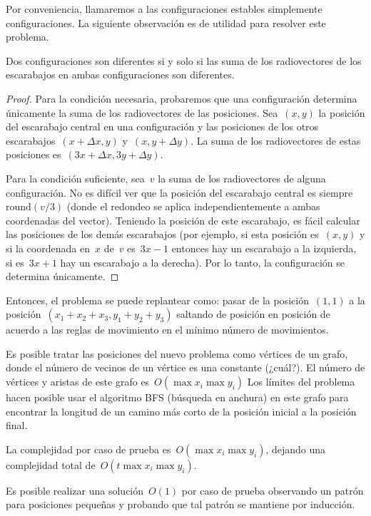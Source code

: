 
Por conveniencia, llamaremos a las configuraciones estables simplemente
configuraciones. La siguiente observación es de utilidad para resolver este problema.

\begin{proposition*}
  Dos configuraciones son diferentes si y solo si las suma de los radiovectores de
  los escarabajos en ambas configuraciones son diferentes.
\end{proposition*}
\begin{proof}
Para la condición necesaria, probaremos que una configuración determina únicamente
la suma de los radiovectores de las posiciones. Sea~$(x, y)$ la posición del
escarabajo central en una configuración y las posiciones de los otros
escarabajos~$(x + \Delta x, y)$ y~$(x, y + \Delta y)$. La suma de los radiovectores
de estas posiciones es~$(3x + \Delta x, 3y + \Delta y)$.

Para la condición suficiente, sea~$v$ la suma de los radiovectores de alguna
configuración. No es difícil ver que la posición del escarabajo central es
siempre~$\text{round}(v / 3)$ (donde el redondeo se aplica independientemente a ambas
coordenadas del vector). Teniendo la posición de este escarabajo, es fácil calcular
las posiciones de los demás escarabajos (por ejemplo, si esta posición es~$(x, y)$ y
si la coordenada en~$x$ de~$v$ es~$3x - 1$ entonces hay un escarabajo a la izquierda,
si es~$3x + 1$ hay un escarabajo a la derecha). Por lo tanto, la configuración se
determina únicamente.
\end{proof}

Entonces, el problema se puede replantear como: pasar de la posición~$(1, 1)$ a la
posición~$(x_1 + x_2 + x_3, y_1 + y_2 + y_3)$ saltando de posición en posición de
acuerdo a las reglas de movimiento en el mínimo número de movimientos.

Es posible tratar las posiciones del nuevo problema como vértices de un grafo, donde
el número de vecinos de un vértice es una constante (¿cuál?). El número de vértices y
aristas de este grafo es~$O(\max x_i \max y_i)$ Los límites del problema hacen posible usar el
algoritmo BFS (búsqueda en anchura) en este grafo para encontrar la longitud de un
camino más corto de la posición inicial a la posición final.

La complejidad por caso de prueba es~$O(\max x_i \max y_i)$, dejando una complejidad
total de~$O(t \max x_i \max y_i)$.

Es posible realizar una solución~$O(1)$ por caso de prueba observando un patrón para
posiciones pequeñas y probando que tal patrón se mantiene por inducción.


